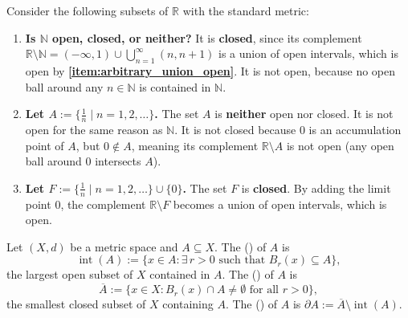 \begin{example}
\label{ex:open_closed_R}
Consider the following subsets of $\mathbb{R}$ with the standard metric:
\begin{enumerate}[label=\textbf{(\alph*)}]
  \item \textbf{Is $\mathbb{N}$ open, closed, or neither?} It is \textbf{closed}, since its
    complement $\mathbb{R} \setminus \mathbb{N} = (-\infty, 1) \cup \bigcup_{n=1}^\infty (n, n+1)$
    is a union of open intervals, which is open by
    \textbf{\ref{item:arbitrary_union_open}}. It is not open,
    because no open ball around any $n \in \mathbb{N}$ is contained in $\mathbb{N}$.
  \item \textbf{Let $A := \{\frac{1}{n} \mid n = 1, 2, \dots\}$.} The set $A$ is \textbf{neither}
    open nor closed. It is not open for the same reason as $\mathbb{N}$. It is not closed because
    $0$ is an accumulation point of $A$, but $0 \notin A$, meaning its complement
    $\mathbb{R} \setminus A$ is not open (any open ball around $0$ intersects $A$).
  \item \textbf{Let $F := \{\frac{1}{n} \mid n = 1, 2, \dots\} \cup \{0\}$.} The set $F$ is
    \textbf{closed}. By adding the limit point $0$, the complement $\mathbb{R} \setminus F$
    becomes a union of open intervals, which is open.
\end{enumerate}
\end{example}

\begin{definition}
\label{def:interior_closure_boundary}
Let $(X,d)$ be a metric space and $A \subseteq X$. The 
() of $A$ is
\[\operatorname{int}(A) := \{x \in A : \exists\, r>0 \text{ such that } B_r(x) \subseteq A\},\]
the largest open subset of $X$ contained in $A$. The  () of
$A$ is
\[\overline{A} := \{x \in X : B_r(x) \cap A \neq \emptyset \text{ for all } r > 0\},\]
the smallest closed subset of $X$ containing $A$. The  () of
$A$ is $\partial A := \overline{A} \setminus \operatorname{int}(A)$.
\end{definition}

